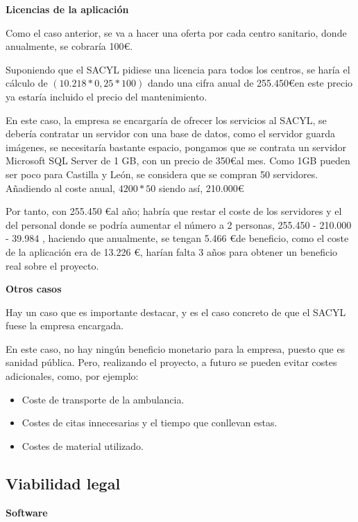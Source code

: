 \textbf{Licencias de la aplicación}

Como el caso anterior, se va a hacer una oferta por cada centro sanitario, donde anualmente, se cobraría 100\euro.

Suponiendo que el SACYL pidiese una licencia para todos los centros, se haría el cálculo de $(10.218 * 0,25 * 100 ) $ dando una cifra anual de 255.450\euro  en este precio ya estaría incluido el precio del mantenimiento.

En este caso, la empresa se encargaría de ofrecer los servicios al SACYL, se debería contratar un servidor con una base de datos, como el servidor guarda imágenes, se necesitaría bastante espacio, pongamos que se contrata un servidor Microsoft SQL Server de 1 GB, con un precio de 350\euro  al mes. Como 1GB pueden ser poco para Castilla y León, se considera que se compran 50 servidores. Añadiendo al coste anual, $4200 * 50 $ siendo así, 210.000\euro

Por tanto, con 255.450 \euro  al año; habría que restar el coste de los servidores y el del personal donde se podría aumentar el número a 2 personas,   255.450 - 210.000 - 39.984 , haciendo que anualmente, se tengan 5.466 \euro   de beneficio, como el coste de la aplicación era de 13.226 \euro, harían falta 3 años para obtener un beneficio real sobre el proyecto.

\textbf{Otros casos}

Hay un caso que es importante destacar, y es el caso concreto de que el SACYL fuese la empresa encargada.

En este caso, no hay ningún beneficio monetario para la empresa, puesto que es sanidad pública. Pero, realizando el proyecto, a futuro se pueden evitar costes adicionales, como, por ejemplo: 
\begin{itemize}
    \item Coste de transporte de la ambulancia.
    \item Costes de citas innecesarias y el tiempo que conllevan estas.
    \item Costes de material utilizado.
\end{itemize}

\subsection{Viabilidad legal}

\textbf{Software}

